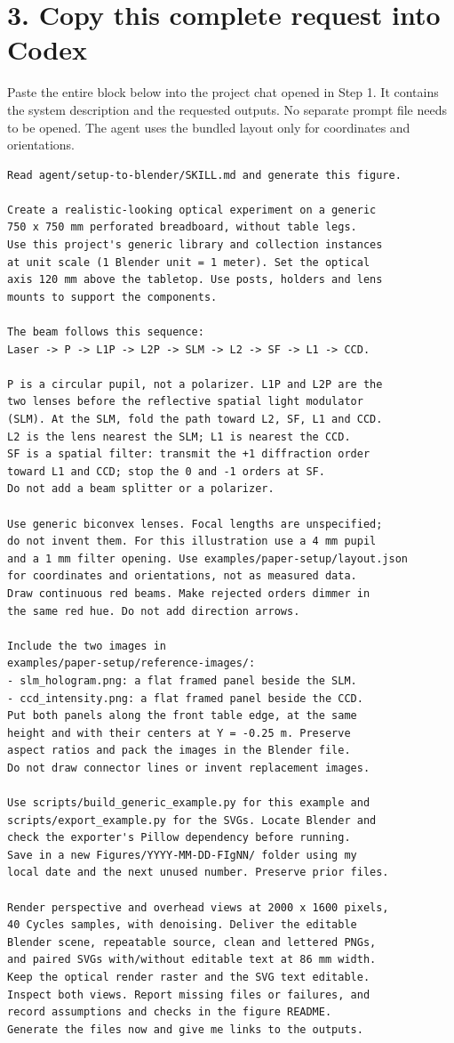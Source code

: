 \documentclass[11pt,a4paper]{article}
\begin{document}
\section*{3. Copy this complete request into Codex}
Paste the entire block below into the project chat opened in Step 1. It contains the system description and the requested outputs. No separate prompt file needs to be opened. The agent uses the bundled layout only for coordinates and orientations.
\begin{Verbatim}[fontsize=\small,baselinestretch=0.94]
Read agent/setup-to-blender/SKILL.md and generate this figure.

Create a realistic-looking optical experiment on a generic
750 x 750 mm perforated breadboard, without table legs.
Use this project's generic library and collection instances
at unit scale (1 Blender unit = 1 meter). Set the optical
axis 120 mm above the tabletop. Use posts, holders and lens
mounts to support the components.

The beam follows this sequence:
Laser -> P -> L1P -> L2P -> SLM -> L2 -> SF -> L1 -> CCD.

P is a circular pupil, not a polarizer. L1P and L2P are the
two lenses before the reflective spatial light modulator
(SLM). At the SLM, fold the path toward L2, SF, L1 and CCD.
L2 is the lens nearest the SLM; L1 is nearest the CCD.
SF is a spatial filter: transmit the +1 diffraction order
toward L1 and CCD; stop the 0 and -1 orders at SF.
Do not add a beam splitter or a polarizer.

Use generic biconvex lenses. Focal lengths are unspecified;
do not invent them. For this illustration use a 4 mm pupil
and a 1 mm filter opening. Use examples/paper-setup/layout.json
for coordinates and orientations, not as measured data.
Draw continuous red beams. Make rejected orders dimmer in
the same red hue. Do not add direction arrows.

Include the two images in
examples/paper-setup/reference-images/:
- slm_hologram.png: a flat framed panel beside the SLM.
- ccd_intensity.png: a flat framed panel beside the CCD.
Put both panels along the front table edge, at the same
height and with their centers at Y = -0.25 m. Preserve
aspect ratios and pack the images in the Blender file.
Do not draw connector lines or invent replacement images.

Use scripts/build_generic_example.py for this example and
scripts/export_example.py for the SVGs. Locate Blender and
check the exporter's Pillow dependency before running.
Save in a new Figures/YYYY-MM-DD-FIgNN/ folder using my
local date and the next unused number. Preserve prior files.

Render perspective and overhead views at 2000 x 1600 pixels,
40 Cycles samples, with denoising. Deliver the editable
Blender scene, repeatable source, clean and lettered PNGs,
and paired SVGs with/without editable text at 86 mm width.
Keep the optical render raster and the SVG text editable.
Inspect both views. Report missing files or failures, and
record assumptions and checks in the figure README.
Generate the files now and give me links to the outputs.
\end{Verbatim}
\clearpage
\end{document}
